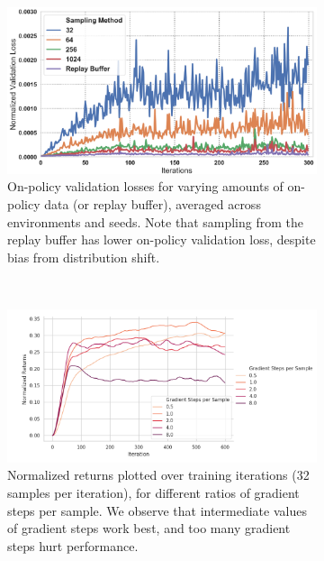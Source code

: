 \begin{figure}[ttt!]
\begin{subfigure}{0.31\linewidth}
\includegraphics[width=0.97\linewidth]{chapters/diagnosing_q/images/overfitting.pdf}
\caption{\label{fig:sampling_validation_loss} On-policy validation losses for varying amounts of on-policy data (or replay buffer), averaged across environments and seeds. Note that sampling from the replay buffer has lower on-policy validation loss, despite bias from distribution shift.}
\end{subfigure}
~\vline~
\begin{subfigure}{0.31\linewidth}
\includegraphics[trim={0 0 7.0cm 0},clip,width=0.97\linewidth]{chapters/diagnosing_q/images/grad_steps_fqi}
\caption{\label{fig:fqi_grad_sweep}Normalized returns plotted over training iterations (32 samples per iteration), for different ratios of gradient steps per sample. We observe that intermediate values of gradient steps work best, and too many gradient steps hurt performance.}
\end{subfigure}
~\vline~
\begin{subfigure}{0.31\linewidth}

\end{subfigure}
\end{figure}

